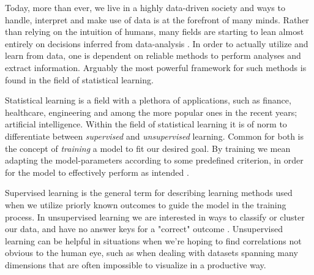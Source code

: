 




Today, more than ever, we live in a highly data-driven society and ways to handle, interpret and make use of data is at the forefront of many minds. 
Rather than relying on the intuition of humans, many fields are starting to lean almost entirely on decisions inferred from data-analysis \cite{foster,Kitchin}.
In order to actually utilize and learn from data, one is dependent on reliable methods to perform analyses and extract information. 
Arguably the most powerful framework for such methods is found in the field of statistical learning. 

Statistical learning is a field with a plethora of applications, such as finance, healthcare, engineering and among the more popular ones in the recent years; artificial intelligence. 
Within the field of statistical learning it is of norm to differentiate between \textit{supervised} and \textit{unsupervised} learning. 
Common for both is the concept of \textit{training} a model to fit our desired goal. 
By training we mean adapting the model-parameters according to some predefined criterion, in order for the model to effectively perform as intended \citep[ p.~1]{hastie}.


Supervised learning is the general term for describing learning methods used when we utilize priorly known outcomes to guide the model in the training process. 
In unsupervised learning we are interested in ways to classify or cluster our data, and have no answer keys for a "correct" outcome \citep[ p.~1]{hastie}.
Unsupervised learning can be helpful in situations when we're hoping to find correlations not obvious to the human eye, such as when dealing with datasets spanning many dimensions that are often impossible to visualize in a productive way.

